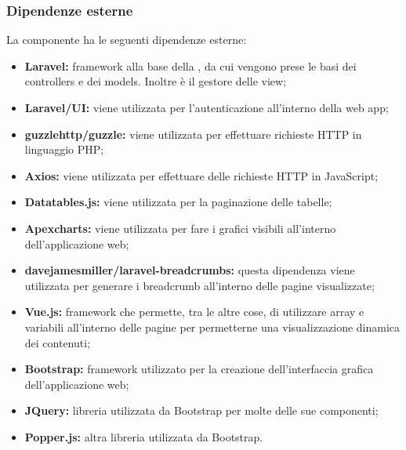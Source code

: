 	\subsubsection{Dipendenze esterne}
		La componente ha le seguenti dipendenze esterne:
		\begin{itemize}
			\item \textbf{Laravel:} framework alla base della , da cui vengono prese le basi dei controllers e dei models. Inoltre è il gestore delle view;
			\item \textbf{Laravel/UI:} viene utilizzata per l'autenticazione all'interno della web app;
			\item \textbf{guzzlehttp/guzzle:} viene utilizzata per effettuare richieste HTTP in linguaggio PHP;
			\item \textbf{Axios:} viene utilizzata per effettuare delle richieste HTTP in JavaScript;
			\item \textbf{Datatables.js:} viene utilizzata per la paginazione delle tabelle;
			\item \textbf{Apexcharts:} viene utilizzata per fare i grafici visibili all'interno dell'applicazione web;
			\item \textbf{davejamesmiller/laravel-breadcrumbs:} questa dipendenza viene utilizzata per generare i breadcrumb all'interno delle pagine visualizzate;
			\item \textbf{Vue.js:} framework che permette, tra le altre cose, di utilizzare array e variabili all'interno delle pagine per permetterne una visualizzazione dinamica dei contenuti;
			\item \textbf{Bootstrap:} framework utilizzato per la creazione dell'interfaccia grafica dell'applicazione web;
			\item \textbf{JQuery:} libreria utilizzata da Bootstrap per molte delle sue componenti;
			\item \textbf{Popper.js:} altra libreria utilizzata da Bootstrap.
		\end{itemize}



